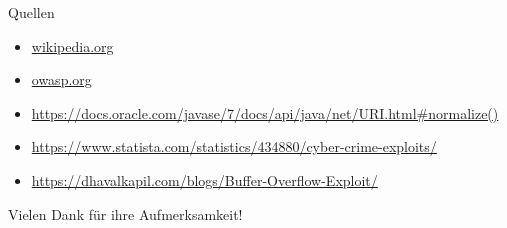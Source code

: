 \documentclass[10pt]{beamer}
\begin{document}





\begin{frame}[fragile]{Quellen}
  \begin{itemize}
    \item \url{wikipedia.org}
    \item \url{owasp.org}
    \item \url{https://docs.oracle.com/javase/7/docs/api/java/net/URI.html#normalize()}
    \item \url{https://www.statista.com/statistics/434880/cyber-crime-exploits/}
    \item \url{https://dhavalkapil.com/blogs/Buffer-Overflow-Exploit/}
  \end{itemize}
\end{frame}

\begin{frame}[fragile]{}
  \huge Vielen Dank f\"ur ihre Aufmerksamkeit!
\end{frame}
\end{document}
